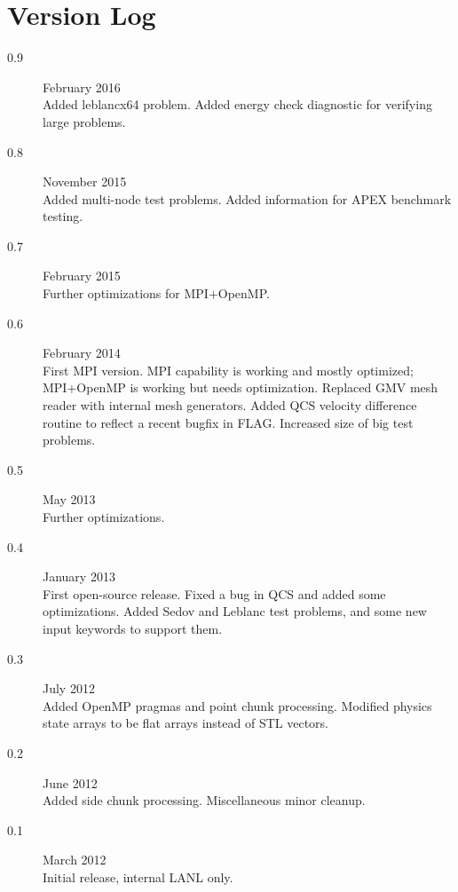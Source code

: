 \documentclass[11pt,letterpaper]{article}
\begin{document}
\appendix
\section{Version Log}

\begin{description}
\item[0.9] February 2016 \\
     Added leblancx64 problem.  Added energy check diagnostic
     for verifying large problems.

\item[0.8] November 2015 \\
     Added multi-node test problems.  Added information for
     APEX benchmark testing.

\item[0.7] February 2015 \\
     Further optimizations for MPI+OpenMP.

\item[0.6] February 2014 \\
     First MPI version.  MPI capability is working and mostly
     optimized; MPI+OpenMP is working but needs optimization.
     Replaced GMV mesh reader with internal mesh generators.
     Added QCS velocity difference routine to reflect a recent
     bugfix in FLAG.  Increased size of big test problems.

\item[0.5] May 2013 \\
     Further optimizations.

\item[0.4] January 2013 \\
     First open-source release.  Fixed a bug in QCS and added some
     optimizations.  Added Sedov and Leblanc test problems, and some
     new input keywords to support them.

\item[0.3] July 2012 \\
     Added OpenMP pragmas and point chunk processing.  Modified physics
     state arrays to be flat arrays instead of STL vectors.

\item[0.2] June 2012 \\
     Added side chunk processing.  Miscellaneous minor cleanup.

\item[0.1] March 2012 \\
     Initial release, internal LANL only.
\end{description}
\end{document}
